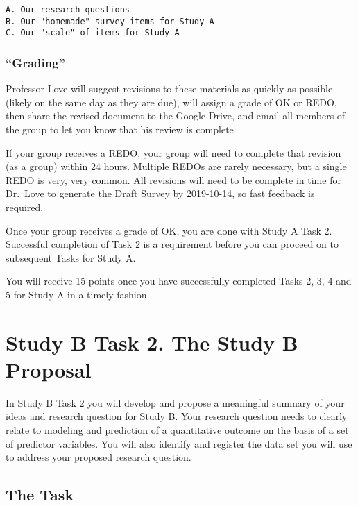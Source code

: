 \documentclass[]{book}
\begin{document}
\begin{verbatim}
A. Our research questions 
B. Our "homemade" survey items for Study A
C. Our "scale" of items for Study A
\end{verbatim}

\hypertarget{grading-1}{%
\subsection{``Grading''}\label{grading-1}}

Professor Love will suggest revisions to these materials as quickly as possible (likely on the same day as they are due), will assign a grade of OK or REDO, then share the revised document to the Google Drive, and email all members of the group to let you know that his review is complete.

If your group receives a REDO, your group will need to complete that revision (as a group) within 24 hours. Multiple REDOs are rarely necessary, but a single REDO is very, very common. All revisions will need to be complete in time for Dr.~Love to generate the Draft Survey by 2019-10-14, so fast feedback is required.

Once your group receives a grade of OK, you are done with Study A Task 2. Successful completion of Task 2 is a requirement before you can proceed on to subsequent Tasks for Study A.

You will receive 15 points once you have successfully completed Tasks 2, 3, 4 and 5 for Study A in a timely fashion.

\hypertarget{task2b}{%
\chapter{Study B Task 2. The Study B Proposal}\label{task2b}}

In Study B Task 2 you will develop and propose a meaningful summary of your ideas and research question for Study B. Your research question needs to clearly relate to modeling and prediction of a quantitative outcome on the basis of a set of predictor variables. You will also identify and register the data set you will use to address your proposed research question.

\hypertarget{the-task-1}{%
\section{The Task}\label{the-task-1}}
\end{document}
